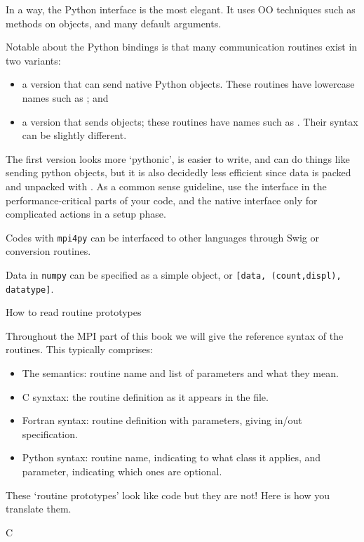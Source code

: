 In a way, the Python interface is the most elegant. It uses \ac{OO}
techniques such as methods on objects, and many default arguments.

Notable about the Python bindings is that many communication routines
exist in two variants:
\begin{itemize}
\item a version that can send native Python objects. These routines
  have lowercase names such as ; and
\item a version that sends  objects; these routines
  have names such as . Their syntax can be slightly different.
\end{itemize}
The first version looks more `pythonic', is easier to write,
and can do things like sending python objects,
but it is also decidedly less efficient since data is packed
and unpacked with . As a common sense guideline,
use the  interface in the performance-critical parts
of your code, and the native interface only for complicated
actions in a setup phase.

Codes with \texttt{mpi4py} can be interfaced to other languages
through Swig or conversion routines.

Data in \texttt{numpy} can be specified as a simple object,
or \texttt{[data, (count,displ), datatype]}.


 {How to read routine prototypes}
\label{sec:protos}

Throughout the MPI part of this book we will give the reference syntax
of the routines. This typically comprises:
\begin{itemize}
\item The semantics: routine name and list of parameters and what they
  mean.
\item C synxtax: the routine definition as it appears in the
   file.
\item Fortran syntax: routine definition with parameters, giving
  in/out specification.
\item Python syntax: routine name, indicating to what class it
  applies, and parameter, indicating which ones are optional.
\end{itemize}

These `routine prototypes' look like code but they are not! Here is
how you translate them.

 {C}

